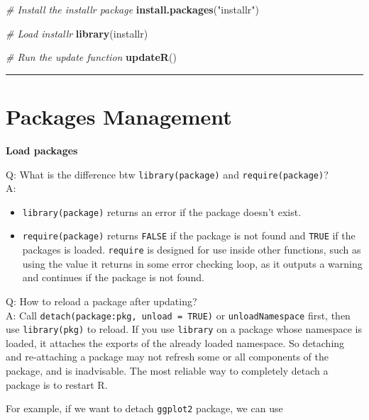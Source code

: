 \documentclass[
]{book}
\newenvironment{Shaded}{\begin{snugshade}}{\end{snugshade}}
\newcommand{\CommentTok}[1]{\textcolor[rgb]{0.56,0.35,0.01}{\textit{#1}}}
\newcommand{\FunctionTok}[1]{\textcolor[rgb]{0.13,0.29,0.53}{\textbf{#1}}}
\newcommand{\NormalTok}[1]{#1}
\newcommand{\StringTok}[1]{\textcolor[rgb]{0.31,0.60,0.02}{#1}}
\begin{document}
\begin{Shaded}
\begin{Highlighting}[]
\CommentTok{\# Install the installr package}
\FunctionTok{install.packages}\NormalTok{(}\StringTok{"installr"}\NormalTok{)}

\CommentTok{\# Load installr}
\FunctionTok{library}\NormalTok{(installr)}

\CommentTok{\# Run the update function}
\FunctionTok{updateR}\NormalTok{()}
\end{Highlighting}
\end{Shaded}

\begin{center}\rule{0.5\linewidth}{0.5pt}\end{center}

\section{Packages Management}\label{packages-management}

\textbf{Load packages}

Q: What is the difference btw \texttt{library(package)} and \texttt{require(package)}?\\
A:

\begin{itemize}
\item
  \texttt{library(package)} returns an error if the package doesn't exist.
\item
  \texttt{require(package)} returns \texttt{FALSE} if the package is not found and \texttt{TRUE} if the packages is loaded. \texttt{require} is designed for use inside other functions, such as using the value it returns in some error checking loop, as it outputs a warning and continues if the package is not found.
\end{itemize}

Q: How to reload a package after updating?\\
A: Call \texttt{detach(package:pkg,\ unload\ =\ TRUE)} or \texttt{unloadNamespace} first, then use \texttt{library(pkg)} to reload. If you use \texttt{library} on a package whose namespace is loaded, it attaches the exports of the already loaded namespace. So detaching and re-attaching a package may not refresh some or all components of the package, and is inadvisable. The most reliable way to completely detach a package is to {restart R}.

For example, if we want to detach \texttt{ggplot2} package, we can use
\end{document}
